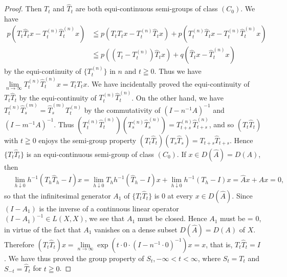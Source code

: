 \begin{proof}
Then $T_{t}$ and $\hat{T}_{t}$ are both equi-continuous semi-groups of class $(C_{0})$. We have 
\[
\begin{aligned} p (T _{t} \hat {T} _{t} x - T _{t} ^{(n)} \hat {T} _{t} ^{(n)} x) & \leqq p (T _{t} \hat {T} _{t} x - T _{t} ^{(n)} \hat {T} _{t} x) + p (T _{t} ^{(n)} \hat {T} _{t} x - T _{t} ^{(n)} \hat {T} _{t} ^{(n)} x) \\ & \leqq p ((T _{t} - T _{t} ^{(n)}) \hat {T} _{t} x) + q (\hat {T} _{t} x - \hat {T} _{t} ^{(n)} x) \end{aligned}
\]
by the equi-continuity of $\{T_t^{(n)}\}$ in $n$ and $t \geqq 0$. Thus we have $\lim\limits_{n \to \infty} T_t^{(n)} \hat{T}_t^{(n)} x = T_t \hat{T}_t x$. We have incidentally proved the equi-continuity of $T_t \hat{T}_t$ by the equi-continuity of $T_t^{(n)} \hat{T}_t^{(n)}$. On the other hand, we have $T_t^{(n)} \hat{T}_s^{(m)} = \hat{T}_s^{(m)} T_t^{(n)}$ by the commutativity of $(I - n^{-1}A)^{-1}$ and $(I - m^{-1}A)^{-1}$. Thus $(T_t^{(n)} \hat{T}_t^{(n)}) (T_s^{(n)} \hat{T}_s^{(n)}) = T_{t+s}^{(n)} \hat{T}_{t+s}^{(n)}$, and so $(T_{t}\hat{T}_{t})$ with $t \geqq 0$ enjoys the semi-group property $(T_{t}\hat{T}_{t})(T_{s}\hat{T}_{s}) = T_{t+s}\hat{T}_{t+s}$. Hence $\{T_{t}\hat{T}_{t}\}$ is an equi-continuous semi-group of class $(C_0)$. If $x \in D(\hat{A}) = D(A)$, then 
\[
\begin{aligned}
&\lim\limits _{h \downarrow 0} h ^{-1} (T _{h} \hat {T} _{h} - I) x  = \lim\limits _{h \downarrow 0} T _{h} h ^{-1} (\hat {T} _{h} - I) x + \lim\limits _{h \downarrow 0} h ^{-1} (T _{h} - I) x = \hat {A} x + A x = 0,
\end{aligned}
\]
so that the infinitesimal generator $A_{1}$ of $\{T_t\hat{T}_t\}$ is $0$ at every $x \in D(\hat{A})$. Since $(I - A_1)$ is the inverse of a continuous linear operator $(I - A_1)^{-1} \in L(X, X)$, we see that $A_{1}$ must be closed. Hence $A_{1}$ must be = $0$, in virtue of the fact that $A_{1}$ vanishes on a dense subset $D(\hat{A}) = D(A)$ of $X$. Therefore $(T_t\hat{T}_t)x = \lim\limits_{n\to \infty}\exp (t\cdot 0\cdot (I - n^{-1}\cdot 0)^{-1})x = x$, that is, $T_{t}\hat{T}_{t} = I$. We have thus proved the group property of $S_{t}, -\infty < t < \infty$, where $S_{t} = T_{t}$ and $S_{-t} = \hat{T}_t$ for $t\geqq 0$. 
\end{proof}

